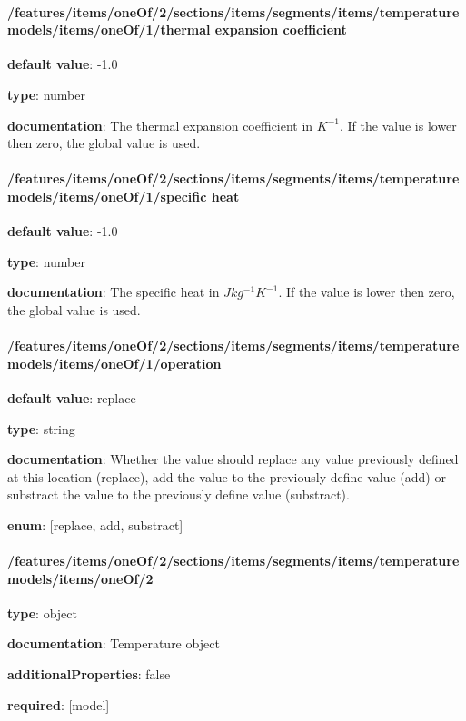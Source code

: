 \begin{itemized}
\end{itemized}\paragraph{/features/items/oneOf/2/sections/items/segments/items/temperature models/items/oneOf/1/thermal expansion coefficient} \begin{itemized}
\item {\bf default value}: -1.0
\item {\bf type}: number
\item {\bf documentation}: The thermal expansion coefficient in $K^{-1}$. If the value is lower then zero, the global value is used.
\end{itemized}\paragraph{/features/items/oneOf/2/sections/items/segments/items/temperature models/items/oneOf/1/specific heat} \begin{itemized}
\item {\bf default value}: -1.0
\item {\bf type}: number
\item {\bf documentation}: The specific heat in $J kg^{-1} K^{-1}$. If the value is lower then zero, the global value is used.
\end{itemized}\paragraph{/features/items/oneOf/2/sections/items/segments/items/temperature models/items/oneOf/1/operation} \begin{itemized}
\item {\bf default value}: replace
\item {\bf type}: string
\item {\bf documentation}: Whether the value should replace any value previously defined at this location (replace), add the value to the previously define value (add) or substract the value to the previously define value (substract).
\item {\bf enum}: [replace, add, substract]\end{itemized}\paragraph{/features/items/oneOf/2/sections/items/segments/items/temperature models/items/oneOf/2} \begin{itemized}
\item {\bf type}: object
\item {\bf documentation}: Temperature object
\item {\bf additionalProperties}: false
\item {\bf required}: [model]\end{itemized}
